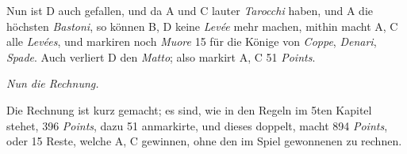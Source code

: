 \documentclass[11pt,a6paper,twoside]{article}
\begin{document}
Nun ist D auch gefallen, und da A und C lauter \textit{Tarocchi} haben, und A die höchsten \textit{Bastoni}, so können B, D keine \textit{Levée} mehr machen, mithin macht A, C alle \textit{Levées}, und markiren noch \textit{Muore} 15 für die Könige von \textit{Coppe}, \textit{Denari}, \textit{Spade}. Auch verliert D den \textit{Matto}; also markirt A, C 51 \textit{Points}.

{\kern4pt \centering\itshape Nun die Rechnung.\\\kern 3pt}

Die Rechnung ist kurz gemacht; es sind, wie in den Regeln im 5ten Kapitel stehet, 396 \textit{Points}, dazu 51 anmarkirte, und dieses doppelt, macht 894 \textit{Points}, oder 15 Reste, welche A, C gewinnen, ohne den im Spiel gewonnenen zu rechnen.
\end{document}
